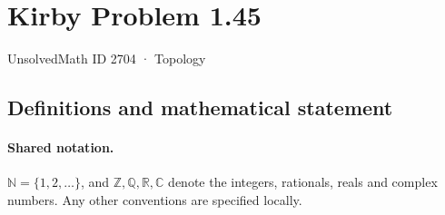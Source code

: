 \documentclass[11pt]{article}
\begin{document}
\setcounter{section}{2703}
\section{Kirby Problem 1.45}\label{2704}
{\small\sffamily UnsolvedMath ID 2704 · Topology}
\subsection{Definitions and mathematical statement}

\paragraph{Shared notation.}$\mathbb N=\{1,2,\ldots\}$, and $\mathbb Z,\mathbb Q,\mathbb R,\mathbb C$ denote the integers, rationals, reals and complex numbers. Any other conventions are specified locally.
\end{document}
